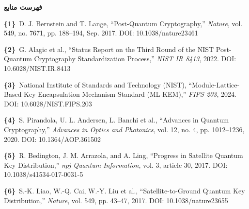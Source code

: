 \documentclass[a4paper,14pt]{extreport}
\begin{document}

\newpage

\begin{center}
  {\Large\bfseries فهرست منابع}
\end{center}
\vspace{0.8cm}

\begin{latin}
\begin{flushleft}
\small
\setlength{\parskip}{8pt}
\setlength{\parindent}{0pt}

\noindent\textbf{\{1\}}~D. J. Bernstein and T. Lange, ``Post-Quantum Cryptography,'' \textit{Nature}, vol. 549, no. 7671, pp. 188--194, Sep. 2017. DOI: 10.1038/nature23461

\vspace{2pt}

\noindent\textbf{\{2\}}~G. Alagic et al., ``Status Report on the Third Round of the NIST Post-Quantum Cryptography Standardization Process,'' \textit{NIST IR 8413}, 2022. DOI: 10.6028/NIST.IR.8413

\vspace{2pt}

\noindent\textbf{\{3\}}~National Institute of Standards and Technology (NIST), ``Module-Lattice-Based Key-Encapsulation Mechanism Standard (ML-KEM),'' \textit{FIPS 203}, 2024. DOI: 10.6028/NIST.FIPS.203

\vspace{2pt}

\noindent\textbf{\{4\}}~S. Pirandola, U. L. Andersen, L. Banchi et al., ``Advances in Quantum Cryptography,'' \textit{Advances in Optics and Photonics}, vol. 12, no. 4, pp. 1012--1236, 2020. DOI: 10.1364/AOP.361502

\vspace{2pt}

\noindent\textbf{\{5\}}~R. Bedington, J. M. Arrazola, and A. Ling, ``Progress in Satellite Quantum Key Distribution,'' \textit{npj Quantum Information}, vol. 3, article 30, 2017. DOI: 10.1038/s41534-017-0031-5

\vspace{2pt}

\noindent\textbf{\{6\}}~S.-K. Liao, W.-Q. Cai, W.-Y. Liu et al., ``Satellite-to-Ground Quantum Key Distribution,'' \textit{Nature}, vol. 549, pp. 43--47, 2017. DOI: 10.1038/nature23655


\end{flushleft}
\end{latin}
\end{document}
